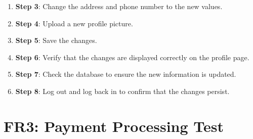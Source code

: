 \documentclass[12pt, titlepage]{article}
\begin{document}
\begin{enumerate}
\begin{itemize}
\begin{enumerate}
            \item \textbf{Step 3}: Change the address and phone number to the new values.
            \item \textbf{Step 4}: Upload a new profile picture.
            \item \textbf{Step 5}: Save the changes.
            \item \textbf{Step 6}: Verify that the changes are displayed correctly on the profile page.
            \item \textbf{Step 7}: Check the database to ensure the new information is updated.
            \item \textbf{Step 8}: Log out and log back in to confirm that the changes persist.
        \end{enumerate}
    \end{itemize}
\end{enumerate}

\section*{FR3: Payment Processing Test}
\end{document}

